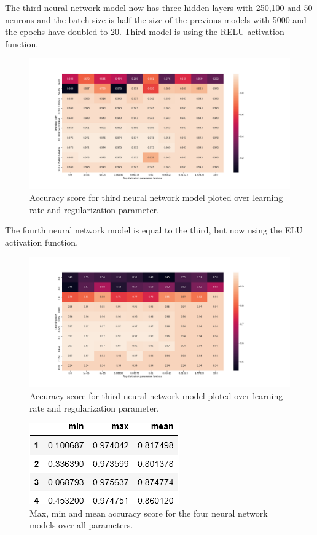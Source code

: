 \documentclass[reprint,english,notitlepage]{revtex4-2}  %
\begin{document}
The third neural network model now has three hidden layers with 250,100 and 50 neurons and the batch size is half the size of the previous models with 5000 and the epochs have doubled to 20. Third model is using the RELU activation function. 
\begin{figure}[!htb]
	\centering\includegraphics[trim=140 20 100 0, scale=0.3]{NNClass4}
	\caption{Accuracy score for third neural network model ploted over learning rate and regularization parameter.  }\label{figure}
\end{figure}

The fourth neural network model is equal to the third, but now using the ELU activation function.  
\begin{figure}[!htb]
	\centering\includegraphics[trim=140 20 100 0, scale=0.3]{NNClass5}
	\caption{Accuracy score for third neural network model ploted over learning rate and regularization parameter.  }\label{figure}
\end{figure}
\begin{figure}[!htb]
	\centering\includegraphics[trim=100 0 50 0, scale=0.6]{NNmodels}
	\caption{Max, min and mean accuracy score for the four neural network models over all parameters.  }\label{figure}
\end{figure}
\end{document}
